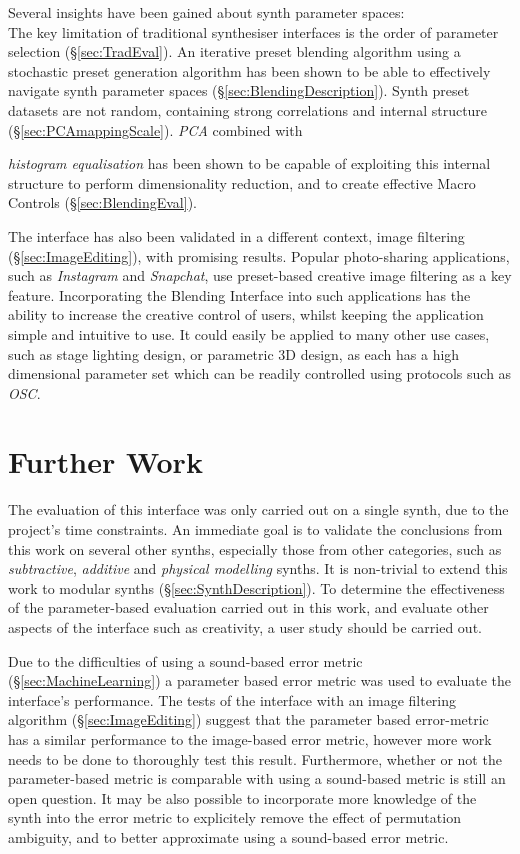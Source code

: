 \documentclass[11pt, oneside]{report}   	%
\begin{document}
Several insights have been gained about synth parameter spaces: \\
The key limitation of traditional synthesiser interfaces is the order of parameter selection (\S \ref{sec:TradEval}). An iterative preset blending algorithm using a stochastic preset generation algorithm has been shown to be able to effectively navigate synth parameter spaces (\S \ref{sec:BlendingDescription}). Synth preset datasets are not random, containing strong correlations and internal structure (\S \ref{sec:PCAmappingScale}). \emph{PCA} combined with {\emph{histogram equalisation} has been shown to be capable of exploiting this internal structure to perform dimensionality reduction, and to create effective Macro Controls (\S \ref{sec:BlendingEval}).
	
The interface has also been validated in a different context, image filtering (\S \ref{sec:ImageEditing}), with promising results. Popular photo-sharing applications, such as \emph{Instagram} and \emph{Snapchat}, use preset-based creative image filtering as a key feature. Incorporating the Blending Interface into such applications has the ability to increase the creative control of users, whilst keeping the application simple and intuitive to use.  It could easily be applied to many other use cases, such as stage lighting design, or parametric 3D design, as each has a high dimensional parameter set which can be readily controlled using protocols such as \emph{OSC}.
\section{Further Work}
The evaluation of this interface was only carried out on a single synth, due to the project's time constraints. An immediate goal is to validate the conclusions from this work on several other synths, especially those from other categories, such as \emph{subtractive}, \emph{additive} and \emph{physical modelling} synths. It is non-trivial to extend this work to modular synths (\S \ref{sec:SynthDescription}). To determine the effectiveness of the parameter-based evaluation carried out in this work, and evaluate other aspects of the interface such as creativity, a user study should be carried out.

Due to the difficulties of using a sound-based error metric (\S \ref{sec:MachineLearning}) a parameter based error metric was used to evaluate the interface's performance. The tests of the interface with an image filtering algorithm (\S \ref{sec:ImageEditing}) suggest that the parameter based error-metric has a similar performance to the image-based error metric, however more work needs to be done to thoroughly test this result. Furthermore, whether or not the parameter-based metric is comparable with using a sound-based metric is still an open question. It may be also possible to incorporate more knowledge of the synth into the error metric to explicitely remove the effect of permutation ambiguity, and to better approximate using a sound-based error metric. 

}
\end{document}
